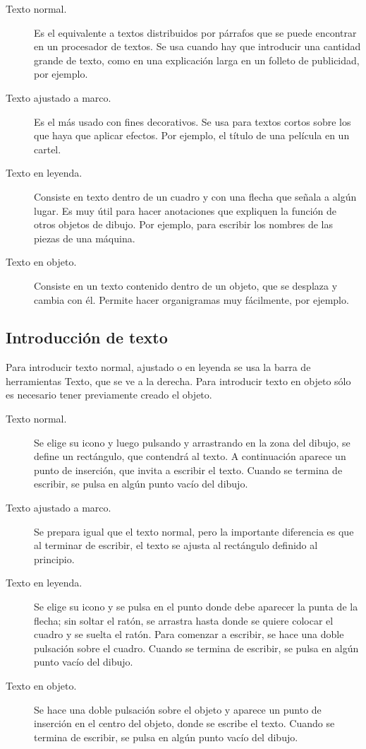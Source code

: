 \begin{description}
\item[Texto normal.] Es el equivalente a textos distribuidos por 
párrafos que se puede encontrar en un procesador de textos. Se usa 
cuando hay que introducir una cantidad grande de texto, como en 
una explicación larga en un folleto de publicidad, por ejemplo.

\item[Texto ajustado a marco.] Es el más usado con fines decorativos. 
Se usa para textos cortos sobre los que haya que aplicar efectos. 
Por ejemplo, el título de una película en un cartel.

\item[Texto en leyenda.] Consiste en texto dentro de un cuadro y 
con una flecha que señala a algún lugar. Es muy útil para hacer 
anotaciones que expliquen la función de otros objetos de dibujo. 
Por ejemplo, para escribir los nombres de las piezas de una máquina.

\item[Texto en objeto.] Consiste en un texto contenido dentro 
de un objeto, que se desplaza y cambia con él. Permite hacer 
organigramas muy fácilmente, por ejemplo.
\end{description}

\subsection{Introducción de texto}

Para introducir texto normal, ajustado o en leyenda se usa la barra de
herramientas Texto, que se ve a la derecha. Para introducir texto en
objeto sólo es necesario tener previamente creado el objeto.

\begin{description}
\item[Texto normal.] Se elige su icono y luego pulsando y 
arrastrando en la zona del dibujo, se define un rectángulo, 
que contendrá al texto. A continuación aparece un punto de 
inserción, que invita a escribir el texto. Cuando se termina de 
escribir, se pulsa en algún punto vacío del dibujo.

\item[Texto ajustado a marco.] Se prepara igual que el texto 
normal, pero la importante diferencia es que al terminar de 
escribir, el texto se ajusta al rectángulo definido al principio.

\item[Texto en leyenda.] Se elige su icono y se pulsa en el punto 
donde debe aparecer la punta de la flecha; sin soltar el ratón, 
se arrastra hasta donde se quiere colocar el cuadro y se suelta 
el ratón. Para comenzar a escribir, se hace una doble pulsación 
sobre el cuadro. Cuando se termina de escribir, se pulsa en algún 
punto vacío del dibujo.

\item[Texto en objeto.] Se hace una doble pulsación sobre el 
objeto y aparece un punto de inserción en el centro del objeto, 
donde se escribe el texto. Cuando se termina de escribir, se 
pulsa en algún punto vacío del dibujo.
\end{description}


